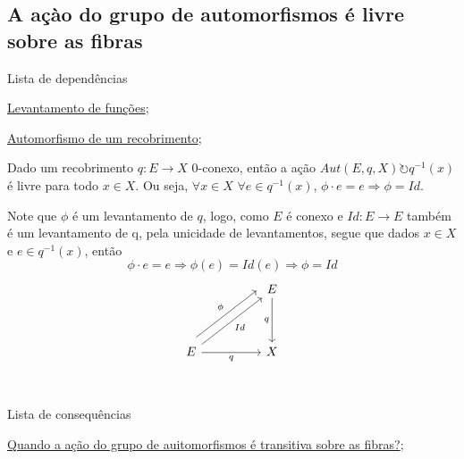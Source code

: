 \subsection{A açào do grupo de automorfismos é livre sobre as fibras}
\label{acao-de-automorfismos-e-livre-prop}
\begin{titlemize}{Lista de dependências}
	\item \hyperref[levantamento-de-funções-prop]{Levantamento de funções};\\
	\item \hyperref[automorfismo-de-recobrimento-def]{Automorfismo de um recobrimento};
\end{titlemize}
\begin{prop}
	Dado um recobrimento $q:E \longrightarrow X$ $0$-conexo, então a ação $Aut(E, q, X) \circlearrowright q^{-1}(x)$ é livre para todo $x \in X$. Ou seja, $\forall x \in X$ $\forall e \in q^{-1}(x)$, $\phi \cdot e = e \Longrightarrow \phi = Id$.\\
\end{prop}

\begin{dem}
    Note que $\phi$ é um levantamento de $q$, logo, como $E$ é conexo e $Id:E \longrightarrow E$ também é um levantamento de q, pela unicidade de levantamentos, segue que dados $x \in X$ e $e \in q^{-1}(x)$, então $$\phi \cdot e = e \Longrightarrow \phi(e) = Id(e) \Longrightarrow \phi = Id$$
    \[\begin{tikzcd}
    	&& E \\
    	\\
    	E && X \\
    	\arrow["q"', from=1-3, to=3-3]
    	\arrow["Id"', from=3-1, to=1-3]
    	\arrow["\phi", shift left=3, from=3-1, to=1-3]
    	\arrow["q"', from=3-1, to=3-3]
    \end{tikzcd}\]
\end{dem}

\begin{titlemize}{Lista de consequências}
	\item \hyperref[acao-de-automorfismo-transitiva-prop]{Quando a ação do grupo de auitomorfismos é transitiva sobre as fibras?};
\end{titlemize}
